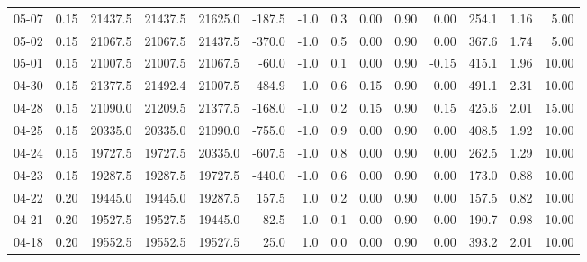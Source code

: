 \begin{threeparttable}
{\begin{tabular}{lrrrrrrrrrrrrr}
  05-07 &     0.15 & 21437.5 & 21437.5 & 21625.0 &     -187.5 &                     -1.0 &                 0.3 &       0.00 &      0.90 &           0.00 &            254.1 &            1.16 &                   5.00 \\
  05-02 &     0.15 & 21067.5 & 21067.5 & 21437.5 &     -370.0 &                     -1.0 &                 0.5 &       0.00 &      0.90 &           0.00 &            367.6 &            1.74 &                   5.00 \\
  05-01 &     0.15 & 21007.5 & 21007.5 & 21067.5 &      -60.0 &                     -1.0 &                 0.1 &       0.00 &      0.90 &          -0.15 &            415.1 &            1.96 &                  10.00 \\
  04-30 &     0.15 & 21377.5 & 21492.4 & 21007.5 &      484.9 &                      1.0 &                 0.6 &       0.15 &      0.90 &           0.00 &            491.1 &            2.31 &                  10.00 \\
  04-28 &     0.15 & 21090.0 & 21209.5 & 21377.5 &     -168.0 &                     -1.0 &                 0.2 &       0.15 &      0.90 &           0.15 &            425.6 &            2.01 &                  15.00 \\
  04-25 &     0.15 & 20335.0 & 20335.0 & 21090.0 &     -755.0 &                     -1.0 &                 0.9 &       0.00 &      0.90 &           0.00 &            408.5 &            1.92 &                  10.00 \\
  04-24 &     0.15 & 19727.5 & 19727.5 & 20335.0 &     -607.5 &                     -1.0 &                 0.8 &       0.00 &      0.90 &           0.00 &            262.5 &            1.29 &                  10.00 \\
  04-23 &     0.15 & 19287.5 & 19287.5 & 19727.5 &     -440.0 &                     -1.0 &                 0.6 &       0.00 &      0.90 &           0.00 &            173.0 &            0.88 &                  10.00 \\
  04-22 &     0.20 & 19445.0 & 19445.0 & 19287.5 &      157.5 &                      1.0 &                 0.2 &       0.00 &      0.90 &           0.00 &            157.5 &            0.82 &                  10.00 \\
  04-21 &     0.20 & 19527.5 & 19527.5 & 19445.0 &       82.5 &                      1.0 &                 0.1 &       0.00 &      0.90 &           0.00 &            190.7 &            0.98 &                  10.00 \\
  04-18 &     0.20 & 19552.5 & 19552.5 & 19527.5 &       25.0 &                      1.0 &                 0.0 &       0.00 &      0.90 &           0.00 &            393.2 &            2.01 &                  10.00 \\

\end{tabular}}
\end{threeparttable}
